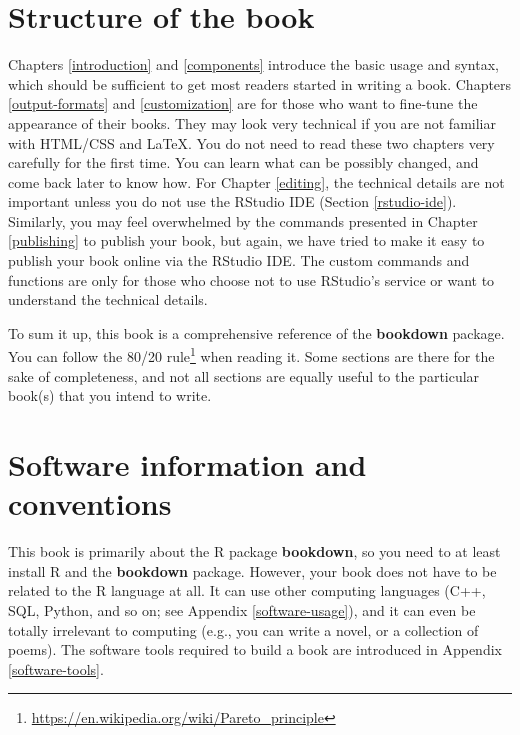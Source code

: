 \documentclass[
  12pt,
]{krantz}
\renewcommand{\href}[2]{#2\footnote{\url{#1}}}
\begin{document}
\hypertarget{structure-of-the-book}{%
\section*{Structure of the book}\label{structure-of-the-book}}


Chapters \ref{introduction} and \ref{components} introduce the basic usage and syntax, which should be sufficient to get most readers started in writing a book. Chapters \ref{output-formats} and \ref{customization} are for those who want to fine-tune the appearance of their books. They may look very technical if you are not familiar with HTML/CSS and LaTeX. You do not need to read these two chapters very carefully for the first time. You can learn what can be possibly changed, and come back later to know how. For Chapter \ref{editing}, the technical details are not important unless you do not use the RStudio IDE (Section \ref{rstudio-ide}). Similarly, you may feel overwhelmed by the commands presented in Chapter \ref{publishing} to publish your book, but again, we have tried to make it easy to publish your book online via the RStudio IDE. The custom commands and functions are only for those who choose not to use RStudio's service or want to understand the technical details.

To sum it up, this book is a comprehensive reference of the \textbf{bookdown} package. You can follow the \href{https://en.wikipedia.org/wiki/Pareto_principle}{80/20 rule} when reading it. Some sections are there for the sake of completeness, and not all sections are equally useful to the particular book(s) that you intend to write.

\hypertarget{software-information-and-conventions}{%
\section*{Software information and conventions}\label{software-information-and-conventions}}


This book is primarily about the R package \textbf{bookdown}, so you need to at least install R and the \textbf{bookdown} package. However, your book does not have to be related to the R language at all. It can use other computing languages (C++, SQL, Python, and so on; see Appendix \ref{software-usage}), and it can even be totally irrelevant to computing (e.g., you can write a novel, or a collection of poems). The software tools required to build a book are introduced in Appendix \ref{software-tools}.
\end{document}
